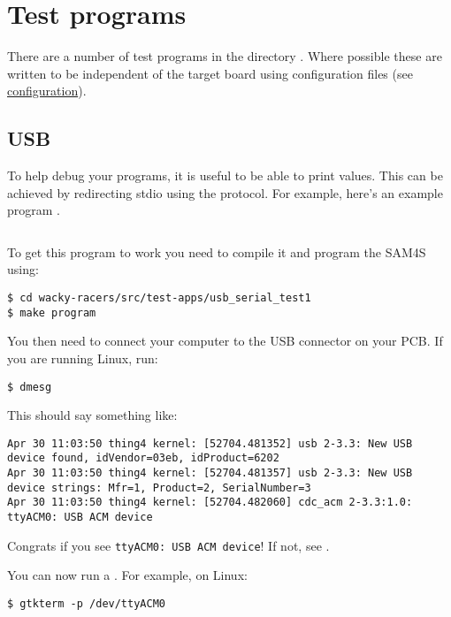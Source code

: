 \chapter{Test programs}
\label{test-programs}

There are a number of test programs in the directory
.  Where possible these are written to be
independent of the target board using configuration files (see
\protect\hyperref[configuration]{configuration}).


\section{USB}
\label{usb-interfacing}

To help debug your programs, it is useful to be able to print values.
This can be achieved by redirecting stdio using the  protocol.  For example, here's an example program
.

\inputminted{C}{../../src/test-apps/usb_serial_test1/usb_serial_test1.c}

To get this program to work you need to compile it and program the
SAM4S using:
%
\begin{verbatim}
$ cd wacky-racers/src/test-apps/usb_serial_test1
$ make program
\end{verbatim}

You then need to connect your computer to the USB connector on your PCB.
If you are running Linux, run:
%
\begin{verbatim}
$ dmesg
\end{verbatim}

This should say something like:
%
\begin{verbatim}
Apr 30 11:03:50 thing4 kernel: [52704.481352] usb 2-3.3: New USB device found, idVendor=03eb, idProduct=6202
Apr 30 11:03:50 thing4 kernel: [52704.481357] usb 2-3.3: New USB device strings: Mfr=1, Product=2, SerialNumber=3
Apr 30 11:03:50 thing4 kernel: [52704.482060] cdc_acm 2-3.3:1.0: ttyACM0: USB ACM device
\end{verbatim}

Congrats if you see \texttt{ttyACM0:\ USB\ ACM\ device}!  If not, see
.

You can now run a . For example, on Linux:
%
\begin{verbatim}
$ gtkterm -p /dev/ttyACM0
\end{verbatim}


